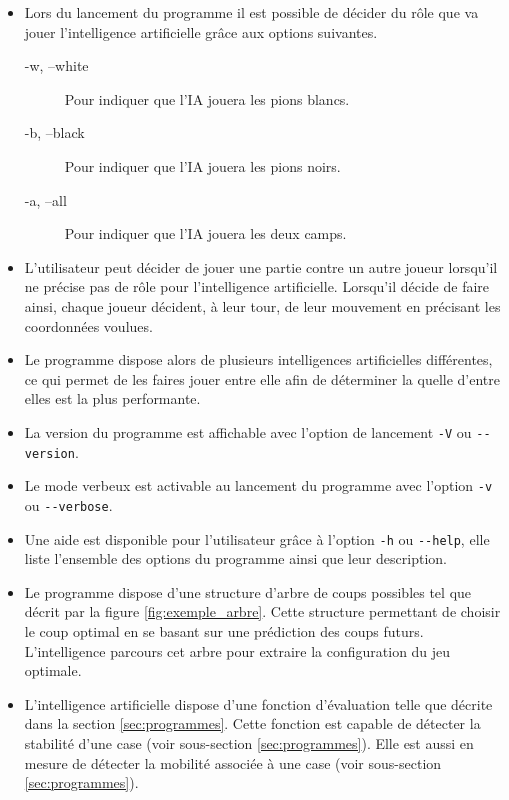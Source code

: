 \documentclass[10pt,a4paper]{article}
\begin{document}
\begin{itemize}
\item Lors du lancement du programme il est possible de décider du rôle que va jouer l'intelligence artificielle grâce aux options suivantes.
\begin{description}
\item [-w, --white] Pour indiquer que l'IA jouera les pions blancs.
\item [-b, --black] Pour indiquer que l'IA jouera les pions noirs.
\item [-a, --all] Pour indiquer que l'IA jouera les deux camps.
\end{description}
\item L'utilisateur peut décider de jouer une partie contre un autre joueur lorsqu'il ne précise pas de rôle pour l'intelligence artificielle. Lorsqu'il décide de faire ainsi, chaque joueur décident, à leur tour, de leur mouvement en précisant les coordonnées voulues.
\item Le programme dispose alors de plusieurs intelligences artificielles différentes, ce qui permet de les faires jouer entre elle afin de déterminer la quelle d'entre elles est la plus performante. 
\item La version du programme est affichable avec l'option de lancement \verb!-V! ou \verb!--version!. 
\item Le mode verbeux est activable au lancement du programme avec l'option \verb!-v! ou \verb!--verbose!.
\item Une aide est disponible pour l'utilisateur grâce à l'option \verb!-h! ou \verb!--help!, elle liste l'ensemble des options du programme ainsi que leur description.
\item Le programme dispose d'une structure d'arbre de coups possibles tel que décrit par la figure \ref{fig:exemple_arbre}. Cette structure permettant de choisir le coup optimal en se basant sur une prédiction des coups futurs. L'intelligence parcours cet arbre pour extraire la configuration du jeu optimale.
\item L'intelligence artificielle dispose d'une fonction d'évaluation telle que décrite dans la section \ref{sec:programmes}. Cette fonction est capable de détecter la stabilité d'une case (voir sous-section \ref{sec:programmes}). Elle est aussi en mesure de détecter la mobilité associée à une case (voir sous-section \ref{sec:programmes}).
\end{itemize}
\end{document}
